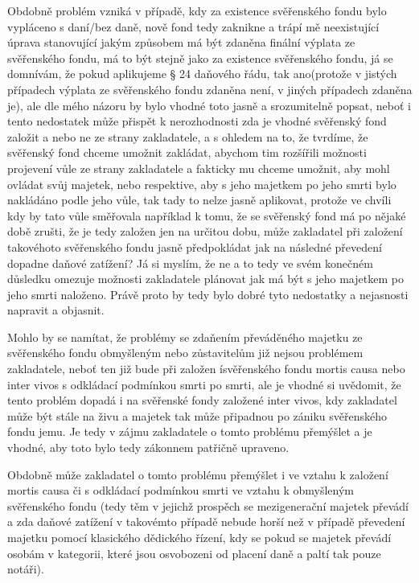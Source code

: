 \documentclass{article}
\begin{document}
Obdobně problém vzniká v případě, kdy za existence svěřenského fondu bylo vypláceno s daní/bez daně, nově fond tedy zaknikne a trápí mě neexistující úprava stanovující jakým způsobem má být zdaněna finální výplata ze svěřenského fondu, má to být stejně jako za existence svěřenského fondu, já se domnívám, že pokud aplikujeme § 24 daňového řádu, tak ano(protože v jistých případech výplata ze svěřenského fondu zdaněna není, v jiných případech zdaněna je), ale dle mého názoru by bylo vhodné toto jasně a srozumitelně popsat, neboť i tento nedostatek může přispět k nerozhodnosti zda je vhodné svěřenský fond založit a nebo ne ze strany zakladatele, a s ohledem na to, že tvrdíme, že svěřenský fond chceme umožnit zakládat, abychom tim rozšířili možnosti projevení vůle ze strany zakladatele a fakticky mu chceme umožnit, aby mohl ovládat svůj majetek, nebo respektive, aby s jeho majetkem po jeho smrti bylo nakládáno podle jeho vůle, tak tady to nelze jasně aplikovat, protože ve chvíli kdy by tato vůle směřovala například k tomu, že se svěřenský fond má po nějaké době zrušti, že je tedy založen jen na určitou dobu, může zakladatel při založení takovéhoto svěřenského fondu jasně předpokládat jak na následné převedení dopadne daňové zatížení? Já si myslím, že ne a to tedy ve svém konečném důsledku omezuje možnosti zakladatele plánovat jak má být s jeho majetkem po jeho smrti naloženo. Právě proto by tedy bylo dobré tyto nedostatky a nejasnosti napravit a objasnit.

Mohlo by se namítat, že problémy se zdaňením převáděného majetku ze svěřenského fondu obmyšleným nebo zůstavitelům již nejsou problémem zakladatele, neboť ten již bude při založen ísvěřenského fondu mortis causa nebo inter vivos s odkládací podmínkou smrti po smrti, ale je vhodné si uvědomit, že tento problém dopadá i na svěřenské fondy založené inter vivos, kdy zakladatel může být stále na živu a majetek tak může připadnou po zániku svěřenského fondu jemu. Je tedy v zájmu zakladatele o tomto problému přemýšlet a je vhodné, aby toto bylo tedy zákonnem patřičně upraveno.

Obdobně může zakladatel o tomto problému přemýšlet i ve vztahu k založení mortis causa či s odkládací podmínkou smrti ve vztahu k obmyšleným svěřenského fondu (tedy těm v jejichž prospěch se mezigenerační majetek převádí a zda daňové zatížení v takovémto případě nebude horší než v případě převedení majetku pomocí klasického dědického řízení, kdy se pokud se majetek převádí osobám v kategorii, které jsou osvobozeni od placení daně a paltí tak pouze notáři).
\end{document}
